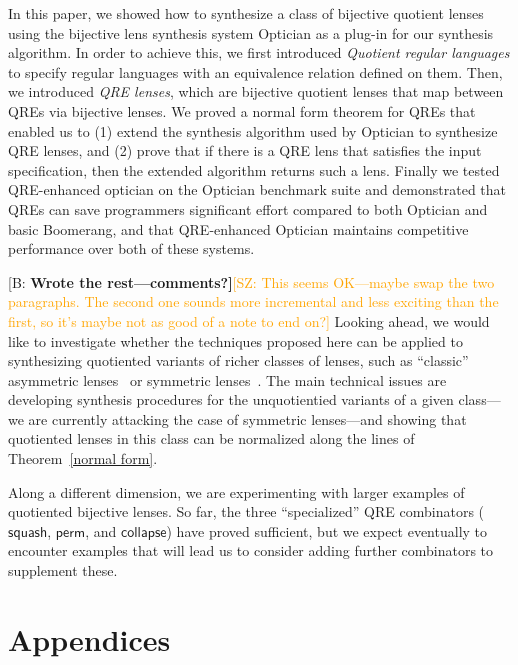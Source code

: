\documentclass[acmsmall,review,anonymous]{acmart}
\newcommand{\FINISH}[3]{\ifdraft\textcolor{#1}{[#2: #3]}\fi}
\newcommand{\BCP}[1]{\FINISH{dkred}{B}{\bf #1}}
\newcommand{\saz}[1]{\FINISH{orange}{SZ}{#1}}
\newcommand{\kw}[1]{\textcolor{dkblue}{\ensuremath{\mathsf{#1}}}}
\begin{document}
In this paper, we showed how to synthesize a class of bijective quotient lenses
using the bijective lens synthesis system Optician as a plug-in for our
synthesis algorithm. In order to achieve this, we first introduced {\em
Quotient regular languages} to specify regular languages with an equivalence
relation defined on them. Then, we introduced {\em QRE lenses}, which
are bijective quotient lenses that map between QREs via bijective lenses. We
proved a normal form theorem for QREs that enabled us to (1) extend the
synthesis algorithm used by Optician to synthesize QRE lenses, and (2) prove
that if there is a QRE lens that satisfies the input specification, then the
extended algorithm returns such a lens. Finally we tested QRE-enhanced optician
on the Optician benchmark suite and demonstrated that QREs can save programmers
significant effort compared to both Optician and basic Boomerang, and that
QRE-enhanced Optician maintains competitive performance over both of these
systems.

\BCP{Wrote the rest---comments?}\saz{This seems OK---maybe swap the two
  paragraphs.  The second one sounds more incremental and less exciting than the
  first, so it's maybe not as good of a note to end on?}
Looking ahead, we would like to investigate whether the techniques proposed
here can be applied to synthesizing quotiented variants of richer classes of
lenses, such as ``classic'' asymmetric lenses~\cite{FosterLenses} or
symmetric lenses~\cite{symmetriclenses}.  The main technical issues are
developing synthesis procedures for the unquotientied variants of a given
class---we are currently attacking the case of symmetric lenses---and
showing that quotiented lenses in this class can be normalized along the
lines of Theorem~\ref{normal form}.

Along a different dimension, we are experimenting with larger examples of
quotiented bijective lenses.  So far, the three ``specialized'' QRE
combinators (\kw{squash}, \kw{perm}, and \kw{collapse}) have proved
sufficient, but we expect eventually to encounter examples that will lead us
to consider adding further combinators to supplement these.





\appendix
{}
\section*{Appendices}
\end{document}
